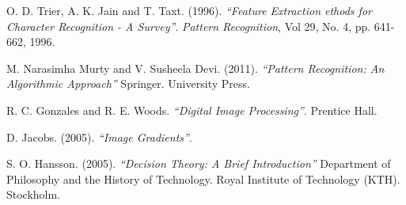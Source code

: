 \begin{thebibliography}{100}
 		O. D. Trier, A. K. Jain and T. Taxt. (1996).
 		\emph{``Feature Extraction ethods for Character Recognition - A Survey''}.
 		\textit{Pattern Recognition}, Vol 29, No. 4, pp. 641-662, 1996.
 		
 		M. Narasimha Murty and V. Susheela Devi. (2011).
 		\emph{``Pattern Recognition: An Algorithmic Approach''}
 		Springer. University Press.
 		
 		R. C. Gonzales and R. E. Woods.
 		\emph{``Digital Image Processing''}.
 		Prentice Hall.
 		
 		D. Jacobs. (2005).
 		\emph{``Image Gradients''}.
 		
 		S. O. Hansson. (2005).
 		\emph{``Decision Theory: A Brief Introduction''}
 		Department of Philosophy and the History of Technology.
 		Royal Institute of Technology (KTH).
 		Stockholm.
				
\end{thebibliography}